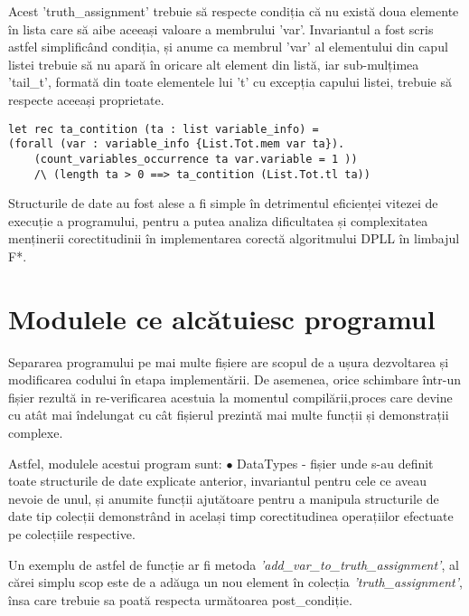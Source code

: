 Acest 'truth\_assignment' trebuie să respecte condiția că nu există doua elemente în lista care să aibe aceeași valoare a membrului 'var'. Invariantul a fost scris astfel simplificând condiția, și anume ca membrul 'var' al elementului din capul listei trebuie să nu apară în oricare alt element din listă, iar sub-mulțimea 'tail\_t', formată din toate elementele lui 't' cu excepția capului listei, trebuie să respecte aceeași proprietate.

\begin{lstlisting}[]
let rec ta_contition (ta : list variable_info) = 
(forall (var : variable_info {List.Tot.mem var ta}). 
	(count_variables_occurrence ta var.variable = 1 ))
	/\ (length ta > 0 ==> ta_contition (List.Tot.tl ta))

\end{lstlisting}

Structurile de date au fost alese a fi simple în detrimentul eficienței vitezei de execuție a programului, pentru a putea analiza dificultatea și complexitatea menținerii corectitudinii în implementarea corectă algoritmului DPLL în limbajul F*. 



\section{Modulele ce alcătuiesc programul}

Separarea programului pe mai multe fișiere are scopul de a ușura \newline dezvoltarea și modificarea codului în etapa implementării. De asemenea, orice \newline schimbare într-un fișier rezultă in re-verificarea acestuia la momentul compilării,\newline proces care devine cu atât mai îndelungat cu cât fișierul prezintă mai multe funcții și demonstrații complexe.

\newpage

Astfel, modulele acestui program sunt: \newline
$\bullet$ DataTypes - fișier unde s-au definit toate structurile de date explicate anterior, \newline invariantul pentru cele ce aveau nevoie de unul, și anumite funcții ajutătoare pentru a manipula structurile de date tip colecții demonstrând in același timp corectitudinea \newline operațiilor efectuate pe colecțiile respective. 

Un exemplu de astfel de funcție ar fi metoda
\textit{'add\_var\_to\_truth\_assignment'}, al cărei simplu scop este de a adăuga un nou element în colecția \textit{'truth\_assignment'}, însa care trebuie sa poată respecta următoarea post\_condiție.

